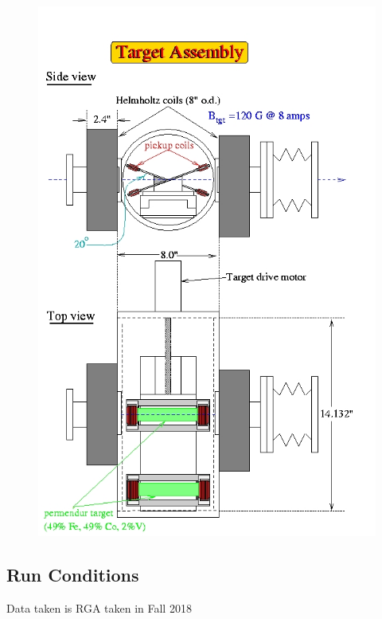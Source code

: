 			 \begin{figure}[H]
    			\centering
    			\includegraphics[width=12cm]{Chapters/Ch2-Experiment/clas-12-system/pics/other/hall-b-poll-target.jpg}
    			\caption{ }
			\end{figure}

    \subsection{Run Conditions}
        Data taken is RGA taken in Fall 2018


